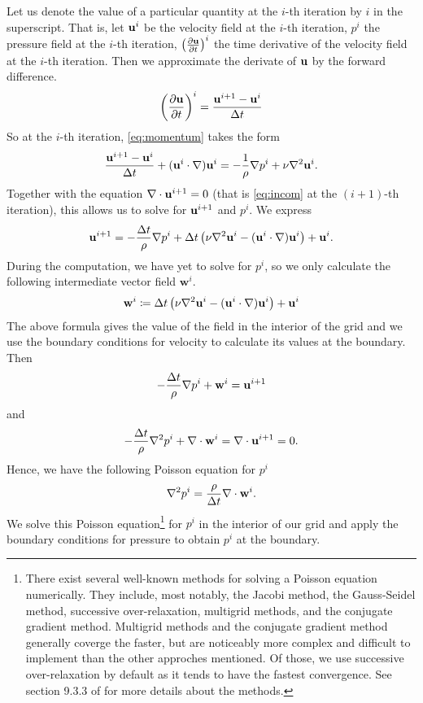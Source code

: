 \documentclass[11pt,a4paper,twoside,openright]{report}
\begin{document}
Let us denote the value of a particular quantity at the $i$-th iteration by $i$ in the superscript. That is, let $\mathbf u^i$ be the velocity field at the $i$-th iteration, $p^i$ the pressure field at the $i$-th iteration, $\left(\frac{\partial \mathbf u}{\partial t}\right)^i$ the time derivative of the velocity field at the $i$-th iteration. Then we approximate the derivate of $\mathbf u$ by the forward difference.
\begin{align}
	\left(\frac{\partial \mathbf u}{\partial t}\right)^i=\frac{\mathbf u^{i+1}-\mathbf u^i}{\Delta t}
\end{align}
So at the $i$-th iteration, \eqref{eq:momentum} takes the form
\begin{align}
	\frac{\mathbf u^{i+1}-\mathbf u^i}{\Delta t}+(\mathbf u^i\cdot\nabla)\mathbf u^i=-\frac1\rho\nabla p^i+\nu\nabla^2\mathbf u^i.
\end{align}
Together with the equation $\nabla\cdot\mathbf u^{i+1}=0$ (that is \eqref{eq:incom} at the $(i+1)$-th iteration), this allows us to solve for $\mathbf u^{i+1}$ and $p^i$. We express
\begin{align}
	\mathbf u^{i+1}=-\frac{\Delta t}\rho\nabla p^i+\Delta t\left(\nu\nabla^2\mathbf u^i-(\mathbf u^i\cdot\nabla)\mathbf u^i\right)+\mathbf u^i.
\end{align}
\newcommand{\ww}{\mathbf w}
During the computation, we have yet to solve for $p^i$, so we only calculate the following intermediate vector field $\ww^i$.
\begin{align*}
	\ww^i\coloneqq\dt\left(\nu\nabla^2\uu^i-(\uu^i\cdot\nabla)\uu^i\right)+\uu^i
\end{align*}
The above formula gives the value of the field in the interior of the grid and we use the boundary conditions for velocity to calculate its values at the boundary. Then
\begin{align*}
	-\frac\dt\rho\nabla p^i+\ww^i=\uu^{i+1}
\end{align*}
and
\begin{align*}
	-\frac\dt\rho\nabla^2p^i+\nabla\cdot\ww^i=\nabla\cdot\uu^{i+1}=0.
\end{align*}
Hence, we have the following Poisson equation for $p^i$
\begin{align*}
	\nabla^2p^i=\frac\rho\dt\nabla\cdot\ww^i.
\end{align*}
We solve this Poisson equation\footnote{There exist several well-known methods for solving a Poisson equation numerically. They include, most notably, the Jacobi method, the Gauss-Seidel method, successive over-relaxation, multigrid methods, and the conjugate gradient method. Multigrid methods and the conjugate gradient method generally coverge the faster, but are noticeably more complex and difficult to implement than the other approches mentioned. Of those, we use successive over-relaxation by default as it tends to have the fastest convergence. See section 9.3.3 of \cite{Epperson} for more details about the methods.} for $p^i$ in the interior of our grid and apply the boundary conditions for pressure to obtain $p^i$ at the boundary.
\end{document}
